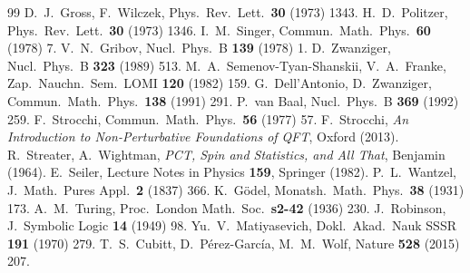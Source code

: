 \documentclass[11pt,a4paper]{article}
\theoremstyle{plain}
\theoremstyle{definition}
\theoremstyle{remark}
\renewcommand{\_}{\oldunderscore\allowbreak}
\begin{document}
\begin{thebibliography}{99}
 D.~J.~Gross, F.~Wilczek, Phys.\ Rev.\ Lett.\ \textbf{30} (1973) 1343.
 H.~D.~Politzer, Phys.\ Rev.\ Lett.\ \textbf{30} (1973) 1346.
 I.~M.~Singer, Commun.\ Math.\ Phys.\ \textbf{60} (1978) 7.
 V.~N.~Gribov, Nucl.\ Phys.\ B \textbf{139} (1978) 1.
 D.~Zwanziger, Nucl.\ Phys.\ B \textbf{323} (1989) 513.
 M.~A.~Semenov-Tyan-Shanskii, V.~A.~Franke, Zap.\ Nauchn.\ Sem.\ LOMI
\textbf{120} (1982) 159.
 G.~Dell'Antonio, D.~Zwanziger, Commun.\ Math.\ Phys.\ \textbf{138} (1991) 291.
 P.~van Baal, Nucl.\ Phys.\ B \textbf{369} (1992) 259.
 F.~Strocchi, Commun.\ Math.\ Phys.\ \textbf{56} (1977) 57.
 F.~Strocchi, \emph{An Introduction to Non-Perturbative Foundations of
QFT}, Oxford (2013).
 R.~Streater, A.~Wightman, \emph{PCT, Spin and Statistics, and All That},
Benjamin (1964).
 E.~Seiler, Lecture Notes in Physics \textbf{159}, Springer (1982).
 P.~L.~Wantzel, J.\ Math.\ Pures Appl.\ \textbf{2} (1837) 366.
 K.~G\"odel, Monatsh.\ Math.\ Phys.\ \textbf{38} (1931) 173.
 A.~M.~Turing, Proc.\ London Math.\ Soc.\ \textbf{s2-42} (1936) 230.
 J.~Robinson, J.\ Symbolic Logic \textbf{14} (1949) 98.
 Yu.~V.~Matiyasevich, Dokl.\ Akad.\ Nauk SSSR \textbf{191} (1970) 279.
 T.~S.~Cubitt, D.~P\'erez-Garc\'ia, M.~M.~Wolf, Nature \textbf{528} (2015) 207.
\end{thebibliography}
\end{document}
